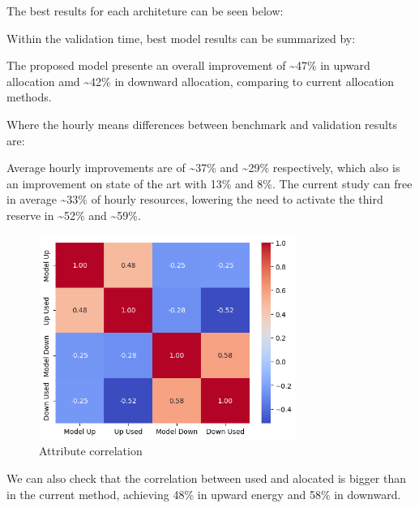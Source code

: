 The best results for each architeture can be seen below:



Within the validation time, best model results can be summarized by:




The proposed model presente an overall improvement of \textasciitilde47\% in upward allocation amd \textasciitilde42\% in downward allocation, comparing to current allocation methods.\par

Where the hourly means differences between benchmark and validation results are:



Average hourly improvements are of \textasciitilde37\% and \textasciitilde29\% respectively, which also is an improvement on state of the art \cite{Algarvio2024} with 13\% and 8\%.
The current study can free in average \textasciitilde33\% of hourly resources, lowering the need to activate the third reserve in \textasciitilde52\% and \textasciitilde59\%.\par



\begin{figure}[H]
    \centering
    \includegraphics[width=0.75\textwidth]{plots/heatmap_correlation_pred.png}
    \caption{Attribute correlation}
    \label{fig:Attribute_correlation}
  \end{figure}


We can also check that the correlation between used and alocated is bigger than in the current method, achieving 48\% in upward energy and 58\% in downward. \par

